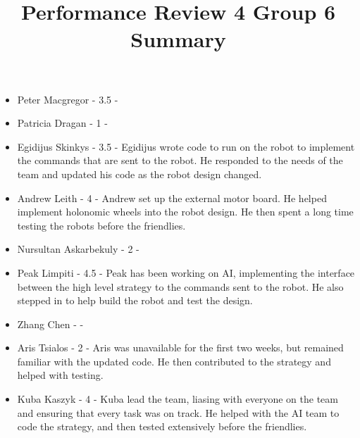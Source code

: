 \documentclass[dvips]{article}
\begin{document}
\sloppy

\title{Performance Review 4 Group 6 Summary}
 
\maketitle
\begin{itemize}
\item Peter Macgregor - 3.5 - 
\item Patricia Dragan - 1 - 
\item Egidijus Skinkys - 3.5 - Egidijus wrote code to run on the robot to implement the commands that are sent to the robot. He responded to the needs of the team and updated his code as the robot design changed.
\item Andrew Leith - 4 - Andrew set up the external motor board. He helped implement holonomic wheels into the robot design. He then spent a long time testing the robots before the friendlies.
\item Nursultan Askarbekuly - 2 - 
\item Peak Limpiti - 4.5 - Peak has been working on AI, implementing the interface between the high level strategy to the commands sent to the robot. He also stepped in to help build the robot and test the design.
\item Zhang Chen -  - 
\item Aris Tsialos - 2 - Aris was unavailable for the first two weeks, but remained familiar with the updated code. He then contributed to the strategy and helped with testing.
\item Kuba Kaszyk - 4 - Kuba lead the team, liasing with everyone on the team and ensuring that every task was on track. He helped with the AI team to code the strategy, and then tested extensively before the friendlies.
\end{itemize}
\end{document}
